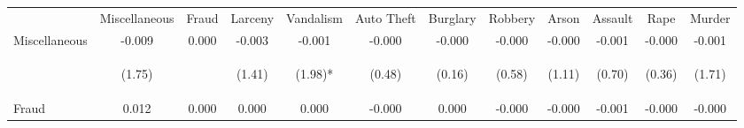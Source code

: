 \begin{tabular}{lccccccccccc}
\toprule \noalign{\smallskip} & Miscellaneous & Fraud & Larceny & Vandalism & Auto Theft & Burglary & Robbery & Arson & Assault & Rape & Murder\\
\noalign{\smallskip}\midrule\noalign{\smallskip}Miscellaneous & -0.009 & 0.000 & -0.003 & -0.001 & -0.000 & -0.000 & -0.000 & -0.000 & -0.001 & -0.000 & -0.001\\
 & \begin{footnotesize}(1.75)\end{footnotesize} & \begin{footnotesize}\end{footnotesize} & \begin{footnotesize}(1.41)\end{footnotesize} & \begin{footnotesize}(1.98)*\end{footnotesize} & \begin{footnotesize}(0.48)\end{footnotesize} & \begin{footnotesize}(0.16)\end{footnotesize} & \begin{footnotesize}(0.58)\end{footnotesize} & \begin{footnotesize}(1.11)\end{footnotesize} & \begin{footnotesize}(0.70)\end{footnotesize} & \begin{footnotesize}(0.36)\end{footnotesize} & \begin{footnotesize}(1.71)\end{footnotesize}\\
\noalign{\smallskip}Fraud & 0.012 & 0.000 & 0.000 & 0.000 & -0.000 & 0.000 & -0.000 & -0.000 & -0.001 & -0.000 & -0.000\\

\end{tabular}
